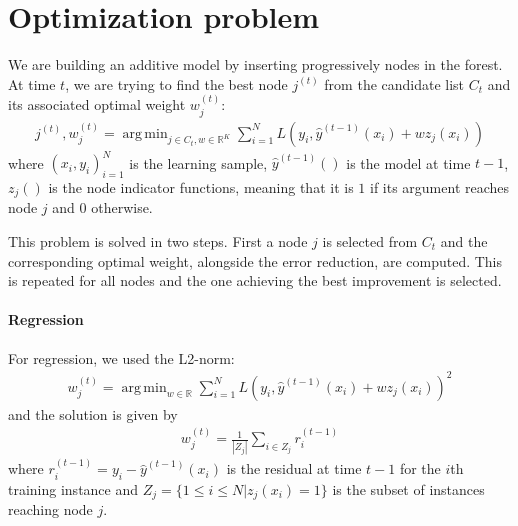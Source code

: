 \documentclass{article}
\DeclareMathOperator*{\argmin}{arg\,min}
\begin{document}
\section{Optimization problem}

We are building an additive model by inserting progressively nodes in the 
forest.
At time $t$, we are trying to find the best node $j^{(t)}$ from the candidate 
list $C_t$ and its associated optimal weight $w_j^{(t)}$:
\begin{align}
j^{(t)},w_j^{(t)} =\argmin_{j\in C_t, w\in \mathbb{R}^K} \sum_{i=1}^{N} L 
\left(y_i, 
\hat{y}^{(t-1)}(x_i) + w z_j(x_i) \right)
\end{align}
where $(x_i, y_i)_{i=1}^N$ is the learning sample, $\hat{y}^{(t-1)}()$ is the 
model at time $t-1$, $z_j()$ is the node indicator functions, meaning that it 
is $1$ if its argument reaches node $j$ and $0$ otherwise.

This problem is solved in two steps. First a node $j$ is selected from $C_t$ 
and the corresponding optimal weight, alongside the error reduction, are 
computed. This is repeated for all nodes and the one achieving the best 
improvement is selected.

\paragraph{Regression}
For regression, we used the L2-norm:
\begin{align}
w_j^{(t)} = \argmin_{w\in \mathbb{R}} \sum_{i=1}^{N} L \left(y_i, 
\hat{y}^{(t-1)}(x_i) + w z_j(x_i) \right)^2
\end{align}
and the solution is given by
\begin{align}\label{eq:L2Solution}
w_j^{(t)} = \frac{1}{|Z_j|} \sum_{i \in Z_j} r_i^{(t-1)}
\end{align}
where $r_i^{(t-1)} = y_i - \hat{y}^{(t-1)}(x_i)$ is the residual at time $t-1$ 
for the $i$th training instance and $Z_j = \{1 \leq i \leq N | z_j(x_i)=1\}$ is 
the subset of instances reaching node $j$.
\end{document}
